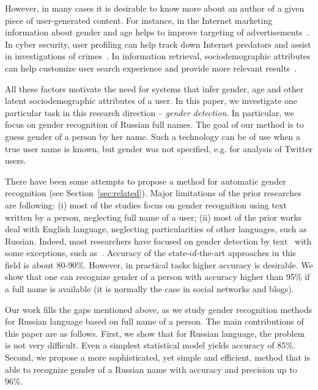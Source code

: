 \documentclass[runningheads,a4paper]{llncs}
\begin{document}
However, in many cases it is desirable to know more about an author of a given piece of user-generated content. For instance, in the Internet marketing information about gender and age helps to improve targeting of advertisements~\cite{twitter2012gender}. In cyber security, user profiling can help track down Internet predators and assist in investigations of crimes~\cite{peersman2011predicting}. In information retrieval, sociodemographic  attributes can help customize user search experience and provide more relevant results~\cite{kharitonov2012gender,bi2013inferring}. 

All these factors motivate the need for systems that infer gender, age and other latent sociodemographic attributes of a user. In this paper, we investigate one particular task in this research direction -- \textit{gender detection}. In particular, we focus on gender recognition of Russian full names. The goal of our method is to guess gender of a person by her name. Such a technology can be of use when a true user name is known, but gender was not specified, e.g. for analysis of Twitter users.       

There have been some attempts to propose a method for automatic gender recognition (see Section~\ref{sec:related}). Major limitations of the prior researches are following: (i) most of the studies focus on gender recognition using text written by a person, neglecting full name of a user; (ii) most of the prior works deal with English language, neglecting particularities of other languages, such as Russian. Indeed, most researchers have focused on gender detection by text~\cite{peersman2011predicting,koppel2002automatically,goswami2009stylometric,rangel2013use,nguyen2013old,ciot2013gender,rao2010classifying} with some exceptions, such as~\cite{burger2011discriminating}. Accuracy of the state-of-the-art approaches in this field is about 80-90\%. However, in practical tasks higher accuracy is desirable. We show that one can recognize gender of a person with accuracy higher than 95\% if a full name is available (it is normally the case in social networks and blogs).

Our work fills the gaps mentioned above, as we study gender recognition methods for Russian language based on full name of a person. The main contributions of this paper are as follows. First,  we show that for Russian language, the problem is not very difficult. Even a simplest statistical model yields accuracy of 85\%. Second, we propose a more sophisticated, yet simple and efficient, method that is able to recognize gender of a Russian name with accuracy and precision up to 96\%. 
\end{document}
